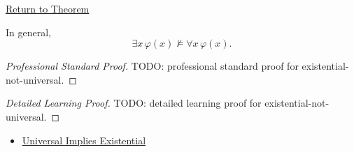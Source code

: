 \newpage
{}
\label{prf:existential-not-universal}

\begin{remark*}[Return]
\hyperref[thm:existential-not-universal]{Return to Theorem}
\end{remark*}

\begin{theorem*}
In general,
\[
\exists x\,\varphi(x)\not\models \forall x\,\varphi(x).
\]
\end{theorem*}

\begin{proof}[Professional Standard Proof]
\LRAProofBodyStart
TODO: professional standard proof for existential-not-universal.
\end{proof}

\begin{proof}[Detailed Learning Proof]
\LRAProofBodyStart
TODO: detailed learning proof for existential-not-universal.
\end{proof}

\begin{remark*}
\end{remark*}

\begin{dependencies}
\begin{itemize}
  \item \hyperref[thm:universal-implies-existential]{Universal Implies Existential}
\end{itemize}
\end{dependencies}

\clearpage

